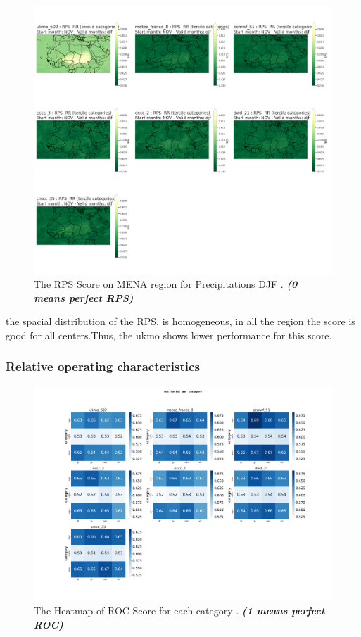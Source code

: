 \begin{figure}[H]
    \centering
    \includegraphics[scale=0.25]{plots/prob/rps/rps_djf_RR.png}
    \caption{The   RPS Score on MENA region for Precipitations DJF   . \textbf{\textit{(0 means perfect RPS)}}}
\end{figure}

the spacial distribution of the RPS, is homogeneous, in all the region the score is good for all centers.Thus, the ukmo shows lower performance for this score.




\subsubsection{Relative operating characteristics}

\begin{figure}[H]
    \centering
    \includegraphics[scale=0.25]{plots/prob/roc/roc_RR_category.png}
    \caption{The Heatmap of ROC Score for each category  . \textbf{\textit{(1 means perfect ROC)}}}
\end{figure}


